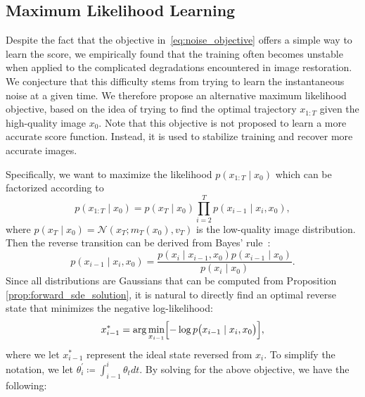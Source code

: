 \documentclass{article}
\theoremstyle{plain}
\theoremstyle{definition}
\theoremstyle{remark}
\begin{document}
\subsection{Maximum Likelihood Learning}

Despite the fact that the objective in~\eqref{eq:noise_objective} offers a simple way to learn the score, we empirically found that the training  often becomes unstable when applied to the complicated degradations encountered in image restoration. We conjecture that this difficulty stems from trying to learn the instantaneous noise at a given time. We therefore propose an alternative maximum likelihood objective, based on the idea of trying to find the optimal trajectory ${x}_{1:T}$ given the high-quality image $x_0$. Note that this objective is not proposed to learn a more accurate score function. Instead, it is used to stabilize training and recover more accurate images. 

Specifically, we want to maximize the likelihood $p({x}_{1:T} \mid {x}_0)$ which can be factorized according to
\begin{equation}
    p({x}_{1:T} \mid {x}_0) = p({x}_{T} \mid {x}_0) \prod_{i=2}^T p({x}_{{i-1}} \mid {x}_{i}, {x}_0),
    \label{eq:joint_objective}
\end{equation}
where $p({x}_T \mid {x}_0)=\mathcal{N}({x}_T; m_{T}({x}_0), v_{T})$ is the low-quality image distribution. Then the reverse transition can be derived from Bayes' rule~\cite{lindholm2022machine}:
\begin{equation}
    p({x}_{{i-1}} \mid {x}_{i}, {x}_0) = \frac{p({x}_{i} \mid {x}_{{i-1}}, {x}_0) p({x}_{{i-1}} \mid {x}_0)}{p({x}_{i} \mid {x}_0)}.
    \label{eq:cond_prob_bayes}
\end{equation}
Since all distributions are Gaussians that can be computed from Proposition \ref{prop:forward_sde_solution}, it is natural to directly find an optimal reverse state that minimizes the negative log-likelihood:
\begin{equation}
\begin{split}
    {x}_{i-1}^{*} = \arg\min_{{x}_{i-1}} \Bigl[ -\log p \bigl({x}_{i-1} \mid {x}_i, {x}_0 \bigr) \Bigr],
    \label{eq:cond_prob_nll}
\end{split}
\end{equation}
where we let ${x}_{i-1}^{*}$ represent the ideal state reversed from ${x}_i$. To simplify the notation, we let $\theta_i^{'} \coloneqq \int_{i-1}^i \theta_t dt$. By solving for the above objective, we have the following:
\end{document}
